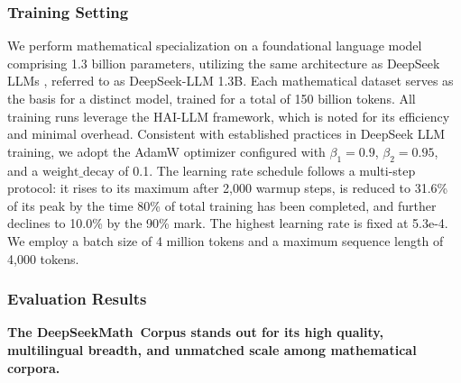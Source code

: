 \subsubsection{Training Setting}
\label{sec:quality-policy}
We perform mathematical specialization on a foundational language model comprising 1.3 billion parameters, utilizing the same architecture as DeepSeek LLMs \citep{deepseek-llm}, referred to as DeepSeek-LLM 1.3B. Each mathematical dataset serves as the basis for a distinct model, trained for a total of 150 billion tokens. All training runs leverage the HAI-LLM \citep{haillm} framework, which is noted for its efficiency and minimal overhead. Consistent with established practices in DeepSeek LLM training, we adopt the AdamW optimizer \citep{adamW} configured with $\beta_1=0.9$, $\beta_2=0.95$, and a $\mathrm{weight\_decay}$ of 0.1. The learning rate schedule follows a multi-step protocol: it rises to its maximum after 2,000 warmup steps, is reduced to 31.6\% of its peak by the time 80\% of total training has been completed, and further declines to 10.0\% by the 90\% mark. The highest learning rate is fixed at 5.3e-4. We employ a batch size of 4 million tokens and a maximum sequence length of 4,000 tokens.

\subsubsection{Evaluation Results}

\textbf{The DeepSeekMath~Corpus stands out for its high quality, multilingual breadth, and unmatched scale among mathematical corpora.}

